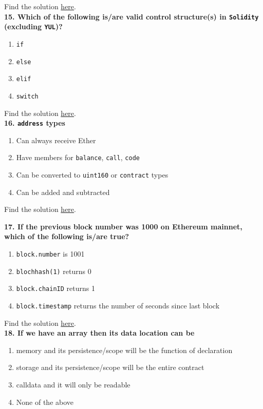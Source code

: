 Find the solution \hyperref[sec:exam2_q14]{here}.\\

\textbf{15. Which of the following is/are valid control structure(s) in \texttt{Solidity} (excluding \texttt{YUL})?}

\begin{enumerate}[label=\Alph*.]
    \item\verb|if|
    \item\verb|else|
    \item\verb|elif|
    \item\verb|switch|
\end{enumerate}

Find the solution \hyperref[sec:exam2_q15]{here}.\\

\textbf{16. \texttt{address} types}

\begin{enumerate}[label=\Alph*.]
    \item Can always receive Ether
    \item Have members for \verb|balance|, \verb|call|, \verb|code|
    \item Can be converted to \verb|uint160| or \verb|contract| types
    \item Can be added and subtracted
\end{enumerate}

Find the solution \hyperref[sec:exam2_q16]{here}.\\

\pagebreak

\textbf{17. If the previous block number was 1000 on Ethereum mainnet, which of the following is/are true?}

\begin{enumerate}[label=\Alph*.]
    \item\verb|block.number| is 1001
    \item\verb|blochhash(1)| returns 0
    \item\verb|block.chainID| returns 1
    \item\verb|block.timestamp| returns the number of seconds since last block
\end{enumerate}

Find the solution \hyperref[sec:exam2_q17]{here}.\\

\textbf{18. If we have an array then its data location can be}

\begin{enumerate}[label=\Alph*.]
    \item memory and its persistence/scope will be the function of declaration
    \item storage and its persistence/scope will be the entire contract
    \item calldata and it will only be readable
    \item None of the above
\end{enumerate}

